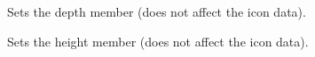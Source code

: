 \begin{comment}
\membersection{wxIcon::SaveFile}\label{wxiconsavefile}

\func{bool}{SaveFile}{\param{const wxString\& }{name}, \param{int}{ type}, \param{wxPalette* }{palette = NULL}}

Saves an icon in the named file.

\wxheading{Parameters}

\docparam{name}{A filename. The meaning of {\it name} is determined by the {\it type} parameter.}

\docparam{type}{One of the following values:

\twocolwidtha{5cm}
\begin{twocollist}
\twocolitem{{\bf wxBITMAP\_TYPE\_ICO}}{Save a Windows icon file.}
\twocolitem{{\bf wxBITMAP\_TYPE\_XPM}}{Save an XPM bitmap file.}
\end{twocollist}

The validity of these flags depends on the platform and wxWindows configuration.}

\docparam{palette}{An optional palette used for saving the icon. TODO: this parameter should
probably be eliminated; instead the app should set the palette before saving.}

\wxheading{Return value}

TRUE if the operation succeeded, FALSE otherwise.

\wxheading{Remarks}

Depending on how wxWindows has been configured, not all formats may be available.

\wxheading{See also}

\helpref{wxIcon::LoadFile}{wxiconloadfile}
\end{comment}

\label{wxiconsetdepth}


Sets the depth member (does not affect the icon data).



\label{wxiconsetheight}


Sets the height member (does not affect the icon data).

